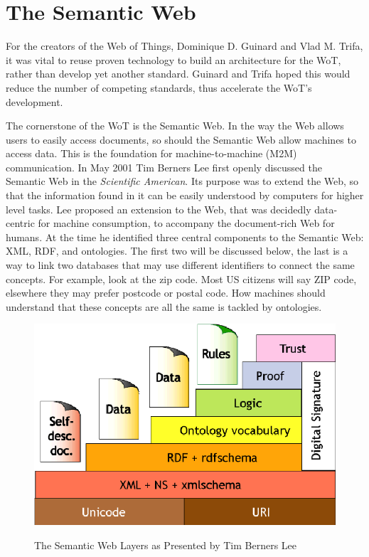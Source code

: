 \section{The Semantic Web}
For the creators of the Web of Things, Dominique D. Guinard and Vlad M. Trifa, it was vital to reuse proven technology to build an architecture for the WoT, rather than develop yet another standard. Guinard and Trifa hoped this would reduce the number of competing standards, thus accelerate the WoT's development. \cite{Guinard.2016} 

The cornerstone of the WoT is the Semantic Web. In the way the Web allows users to easily access documents, so should the Semantic Web allow machines to access data. This is the foundation for machine-to-machine (M2M) communication. In May 2001 Tim Berners Lee first openly discussed the Semantic Web in the \textit{Scientific American}. Its purpose was to extend the Web, so that the information found in it can be easily understood by computers for higher level tasks. Lee proposed an extension to the Web, that was decidedly data-centric for machine consumption, to accompany the document-rich Web for humans. At the time he identified three central components to the Semantic Web: XML, RDF, and ontologies. The first two will be discussed below, the last is a way to link two databases that may use different identifiers to connect the same concepts. For example, look at the zip code. Most US citizens will say ZIP code, elsewhere they may prefer postcode or postal code. How machines should understand that these concepts are all the same is tackled by ontologies. \cite{berners2001semantic}

\begin{figure}[th]
\centering
\includegraphics[width=\textwidth]{Figures/SemWebLayer}
\caption{The Semantic Web Layers as Presented by Tim Berners Lee}
\cite{berners2001semantic}
\label{fig:semWebCake}
\end{figure}





